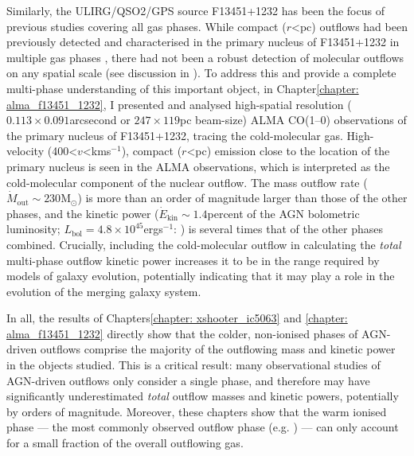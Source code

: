 Similarly, the ULIRG/QSO2/GPS source F13451+1232 has been the focus of previous studies covering all gas phases. While compact ($r$\;\textless{}\;pc) outflows had been previously detected and characterised in the primary nucleus of F13451+1232 in multiple gas phases \citep{Morganti2013_4c1250, Rose2018, Tadhunter2018, VillarMartin2023}, there had not been a robust detection of molecular outflows on any spatial scale (see discussion in \citealt{VillarMartin2023}). To address this and provide a complete multi-phase understanding of this important object, in Chapter\;\ref{chapter: alma_f13451_1232}, I presented and analysed high-spatial resolution ($0.113\times0.091$\;arcsecond or $247\times119$\;pc beam-size) ALMA CO(1--0) observations of the primary nucleus of F13451+1232, tracing the cold-molecular gas. High-velocity (400\;\textless\;$v$\;\textless{}\;km\;s$^{-1}$), compact ($r$\;\textless{}\;pc) emission close to the location of the primary nucleus is seen in the ALMA observations, which is interpreted as the cold-molecular component of the nuclear outflow. The mass outflow rate ($\dot{M}_\mathrm{out}\sim230$\;M$_\odot$) is more than an order of magnitude larger than those of the other phases, and the kinetic power ($\dot{E}_\mathrm{kin}\sim1.4$\;per\;cent of the AGN bolometric luminosity; $L_\mathrm{bol}=4.8\times10^{45}$\;erg\;s$^{-1}$: \citealt{Rose2018}) is several times that of the other phases combined. Crucially, including the cold-molecular outflow in calculating the \textit{total} multi-phase outflow kinetic power increases it to be in the range required by models of galaxy evolution, potentially indicating that it may play a role in the evolution of the merging galaxy system.

In all, the results of Chapters\;\ref{chapter: xshooter_ic5063} and \ref{chapter: alma_f13451_1232} directly show that the colder, non-ionised phases of AGN-driven outflows comprise the majority of the outflowing mass and kinetic power in the objects studied. This is a critical result: many observational studies of AGN-driven outflows only consider a single phase, and therefore may have significantly underestimated \textit{total} outflow masses and kinetic powers, potentially by orders of magnitude. Moreover, these chapters show that the warm ionised phase --- the most commonly observed outflow phase (e.g. \citealt{Kraemer2000II, VillarMartin1999, Das2006, Harrison2014, Tadhunter2019}) --- can only account for a small fraction of the overall outflowing gas.

